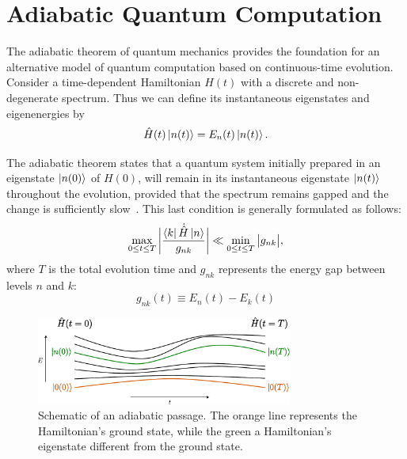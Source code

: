 \section{Adiabatic Quantum Computation}
\label{Section:AQC}
The adiabatic theorem of quantum mechanics provides the foundation for an alternative model
of quantum computation based on continuous-time evolution. Consider a time-dependent Hamiltonian
$H(t)$ with a discrete and non-degenerate spectrum. Thus we can define its instantaneous
eigenstates and eigenenergies by
\begin{equation}
    \hat{H}(t) \ket{n(t)} = E_n (t) \ket{n(t)}.
    \label{eq:instantaneous_eigenstates}
\end{equation}

\noindent The adiabatic theorem states that a quantum system initially prepared in an eigenstate
$\ket{n(0)}$ of  $H(0)$, will remain in its instantaneous eigenstate $\ket{n(t)}$ throughout
the evolution, provided that the spectrum remains gapped and the change is sufficiently
slow~\cite{sarandy_consistency_2004,albash_adiabatic_2018}. This last condition is generally formulated as follows:
\begin{equation}
    \max_{0 \leq t \leq T} \bigg| \dfrac{\bra{k} \dot{\hat{H}} \ket{n}}{g_{nk}} \bigg| \ll \min_{0 \leq t \leq T} \big| g_{nk} \big|,
    \label{eq:adiabatic_condition}
\end{equation}
where $T$ is the total evolution time and $g_{nk}$ represents the energy gap between levels $n$ and $k$: 
\begin{equation}
    g_{nk}(t) \equiv E_n(t) - E_k(t)
    \label{eq:energy_gap}
\end{equation}

\begin{figure}[h]
    \centering
    \includegraphics[width=0.75\textwidth]{01-introduction/figs/adiabatic_theorem.pdf}
    \caption{Schematic of an adiabatic passage. The orange line represents the Hamiltonian's ground state, while
    the green a Hamiltonian's eigenstate different from the ground state.}
    \label{fig:adiabatic_passage}
\end{figure}

